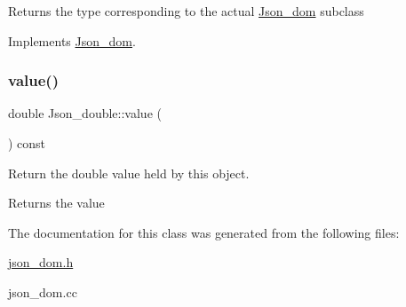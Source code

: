 \begin{DoxyReturn}{Returns}
the type corresponding to the actual \mbox{\hyperlink{classJson__dom}{Json\+\_\+dom}} subclass 
\end{DoxyReturn}


Implements \mbox{\hyperlink{classJson__dom_aed953eca1e112aade66511ad1bbf82b8}{Json\+\_\+dom}}.

\mbox{\label{classJson__double_ab9919eeb72c3604f67a1a88804eb5734}} 
\subsubsection{\texorpdfstring{value()}{value()}}
{\footnotesize\ttfamily double Json\+\_\+double\+::value (\begin{DoxyParamCaption}{ }\end{DoxyParamCaption}) const\hspace{0.3cm}{\ttfamily [inline]}}

Return the double value held by this object. \begin{DoxyReturn}{Returns}
the value 
\end{DoxyReturn}


The documentation for this class was generated from the following files\+:\begin{DoxyCompactItemize}
\item 
\mbox{\hyperlink{json__dom_8h}{json\+\_\+dom.\+h}}\item 
json\+\_\+dom.\+cc\end{DoxyCompactItemize}
